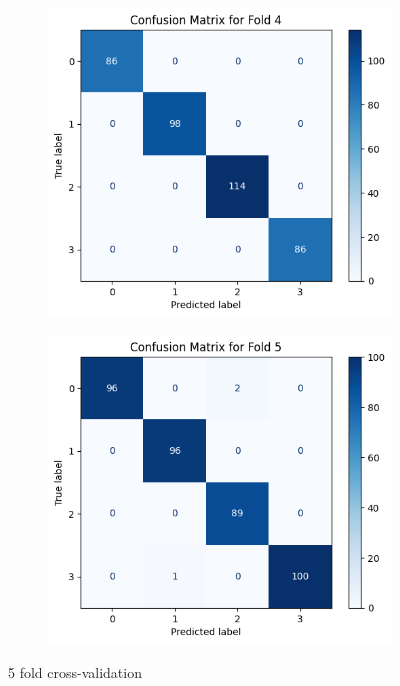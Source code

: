 \documentclass{article}
\begin{document}
\begin{figure}[H]
    \begin{subfigure}[b]{0.33\textwidth}
        \centering
        \includegraphics[width=\textwidth]{img/Q2/f4.png}
        \label{fig:image4}
    \end{subfigure}
    \hfill
    \begin{subfigure}[b]{0.33\textwidth}
        \centering
        \includegraphics[width=\textwidth]{img/Q2/f5.png}
        \label{fig:image5}
    \end{subfigure}
    
    \caption{5 fold cross-validation}
    \label{fig:five_images}
\end{figure}
\end{document}
